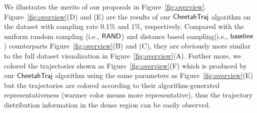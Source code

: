 We illustrates the merits of our proposals in Figure~\ref{fig:overview}. Figure~\ref{fig:overview}(D) and (E) are the results of our $\mathsf{CheetahTraj}{}$ algorithm on the \pt{} dataset with sampling rate $0.1\%$ and $1\%$, respectively. Compared with the uniform random sampling (i.e., $\mathsf{RAND}$) and distance based sampling(i.e., $\mathsf{baseline}$) counterparts Figure~\ref{fig:overview}(B) and (C), they are obviously more similar to the full dataset visualization in Figure~\ref{fig:overview}(A). 
Further more, we colored the trajectories shown as Figure~\ref{fig:overview}(F) which is produced by our $\mathsf{CheetahTraj}{}$ algorithm using the same parameters as Figure~\ref{fig:overview}(E) but the trajectories are colored according to their algorithm-generated representativeness (warmer color means more representative), thus the trajectory distribution information in the dense region can be easily observed.




